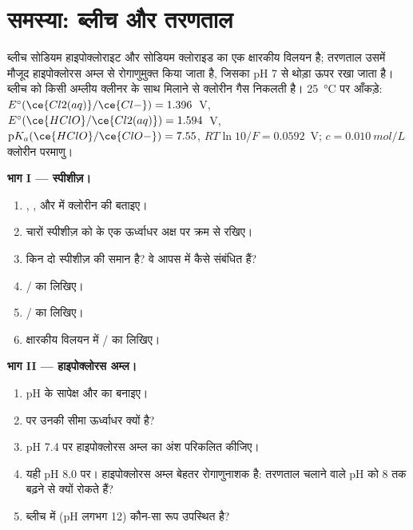 \section{समस्या: ब्लीच और तरणताल}

\begin{problem}
\label{pb:b1:e-ph-diagrams:1}
ब्लीच सोडियम हाइपोक्लोराइट और सोडियम क्लोराइड का एक क्षारकीय विलयन है;
तरणताल उसमें मौजूद हाइपोक्लोरस अम्ल से रोगाणुमुक्त किया जाता है,
जिसका pH 7 से थोड़ा ऊपर रखा जाता है। ब्लीच को किसी अम्लीय क्लीनर के साथ मिलाने से
क्लोरीन गैस निकलती है। \qty{25}{\celsius} पर आँकड़े: $E^\circ(\ce{Cl2(aq)}/\ce{Cl-})
= 1.396$~V, $E^\circ(\ce{HClO}/\ce{Cl2(aq)}) = 1.594$~V,
$\mathrm{p}K_a(\ce{HClO}/\ce{ClO-}) = 7.55$, $RT\ln 10/F = 0.0592$~V;
 $c = \qty{0.010}{mol/L}$ क्लोरीन परमाणु।

\medskip
\noindent\textbf{भाग I --- स्पीशीज़।}
\begin{enumerate}
  \item {}, ,
         और  में क्लोरीन की  बताइए।
  \item चारों स्पीशीज़ को  के एक ऊर्ध्वाधर अक्ष पर क्रम से रखिए।
  \item किन दो स्पीशीज़ की  समान है? वे आपस में कैसे
        संबंधित हैं?
  \item {}/ का  लिखिए।
  \item {}/ का  लिखिए।
  \item क्षारकीय विलयन में / का  लिखिए।
\end{enumerate}

\medskip
\noindent\textbf{भाग II --- हाइपोक्लोरस अम्ल।}
\begin{enumerate}[resume]
  \item pH के सापेक्ष  और  का 
        बनाइए।
  \item {} पर उनकी सीमा ऊर्ध्वाधर क्यों है?
  \item pH 7.4 पर हाइपोक्लोरस अम्ल का अंश परिकलित कीजिए।
  \item यही pH 8.0 पर। हाइपोक्लोरस अम्ल बेहतर रोगाणुनाशक है: तरणताल
        चलाने वाले pH को 8 तक बढ़ने से क्यों रोकते हैं?
  \item ब्लीच में (pH लगभग 12) कौन-सा रूप उपस्थित है?
\end{enumerate}


\end{problem}
